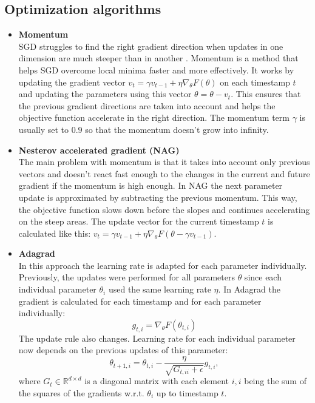 \subsection{Optimization algorithms}
\begin{itemize}
  \item \textbf{Momentum} \\
    SGD struggles to find the right gradient direction when updates in one dimension are much steeper than in another \autocite{sutton1986two}. Momentum is a method that helps SGD overcome local minima faster and more effectively. It works by updating the gradient vector $ v_t = \gamma v_{t-1} + \eta \nabla_\theta F(\theta) $ on each timestamp $t$ and updating the parameters using this vector $ \theta = \theta - v_t $. This ensures that the previous gradient directions are taken into account and helps the objective function accelerate in the right direction. The momentum term $\gamma$ is usually set to $0.9$ so that the momentum doesn't grow into infinity.
  \item \textbf{Nesterov accelerated gradient (NAG)} \autocite{nesterov1983method} \\
    The main problem with momentum is that it takes into account only previous vectors and doesn't react fast enough to the changes in the current and future gradient if the momentum is high enough. In NAG the next parameter update is approximated by subtracting the previous momentum. This way, the objective function slows down before the slopes and continues accelerating on the steep areas. The update vector for the current timestamp $t$ is calculated like this: $ v_t = \gamma v_{t-1} + \eta \nabla_\theta F(\theta - \gamma v_{t-1}) $.
  \item \textbf{Adagrad} \autocite{duchi2011adaptive} \\
    In this approach the learning rate is adapted for each parameter individually. Previously, the updates were performed for all parameters $\theta$ since each individual parameter $\theta_i$ used the same learning rate $\eta$. In Adagrad the gradient is calculated for each timestamp and for each parameter individually:
    \[ g_{t,i} = \nabla_\theta F(\theta_{t,i}) \]
    The update rule also changes. Learning rate for each individual parameter now depends on the previous updates of this parameter:
    \[ \theta_{t+1, i} = \theta_{t, i} - \frac{\eta}{\sqrt{G_{t, ii} + \epsilon}} g_{t,i}, \]
    where $ G_t \in \mathbb{R}^{d \times d} $ is a diagonal matrix with each element $i, i$ being the sum of the squares of the gradients w.r.t. $ \theta_i $ up to timestamp $t$.

\end{itemize}
